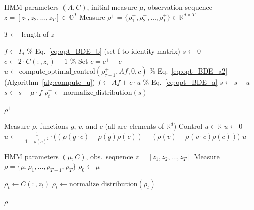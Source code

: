 \documentclass[twoside,11pt]{article}
\def\Re{\mathbb{R}}
\newcommand{\field}[1]{\mathbb{#1}}
\def\Re{\field{R}}
\def\Re{\mathbb{R}}
\renewcommand{\Re}{\mathbb{R}}
\def\clN{{\cal N}}
\def\bO{\mathbb{O}}
\def\dfltr{{\text{\rm (dfltr)}}}
\begin{document}
\begin{algorithm}
  \caption{Dual filter $\clN^\dfltr$ (single-shot)}
  \label{alg:dual_filter_single_shot}
  \begin{algorithmic}[1]
  \REQUIRE HMM parameters $(A,C)$, initial measure $\mu$, observation sequence $z
  =[z_1,z_2,\hdots,z_T]\in\bO^T$
  \ENSURE Measure $\rho^+ = \{\rho_1^+,\rho_2^+,\hdots,\rho_{T}^+\}\in \Re^{d\times T}$
  
  \STATE $T \gets$ length of $z$
  
    \STATE $f \gets I_d$ \hfill \% Eq.~\eqref{eq:opt_BDE_b} (set f to identity matrix)
    \STATE $s \gets 0$
      \STATE $c \gets 2 \cdot C(:,z_{\tau}) - 1$ \hfill \% Set $c= c^+-c^-$
      \STATE $u \gets \text{compute\_optimal\_control}(\rho^+_{\tau-1}, {A}f, 0, c)$ \hfill \% Eq.~\eqref{eq:opt_BDE_a2} (Algorithm~\ref{alg:compute_u})
      \STATE $f \gets A f + c \cdot u$ \hfill \% Eq.~\eqref{eq:opt_BDE_a}
      \STATE $s \gets s-u$
    \ENDFOR
    \STATE $s \gets  s+\mu \cdot f$
    \STATE $\rho^+_t \gets \text{normalize\_distribution}(s)$
  \ENDFOR
  
  \RETURN $\rho^+$
  
  \end{algorithmic}
\end{algorithm}




\begin{algorithm}
\caption{Computation of control input $u$}
\label{alg:compute_u}
\begin{algorithmic}[1]
\REQUIRE Measure $\rho$, functions $g$, $v$, and $c$ (all are elements
of $\Re^d$)
\ENSURE Control $u\in\Re$
    \STATE $u \gets 0$
\ELSE
    \STATE $u \gets -\frac{1}{1 - \rho(c)^2} \cdot \big( (\rho(g \cdot c) - \rho(g) \rho(c)) + (\rho(v) - \rho(v \cdot c) \rho(c)) \big)$
\ENDIF
\RETURN $u$

\end{algorithmic}
\end{algorithm}

\begin{algorithm}
  \caption{Initialization of $\rho$}
  \label{alg:initialize_rho}
  \begin{algorithmic}[1]
  \REQUIRE HMM parameters $(\mu,C)$, obs.~sequence $z
  =[z_1,z_2,\hdots,z_T]$
  \ENSURE Measure $\rho = \{\mu,\rho_1,\hdots,\rho_{T-1},\rho_T\}$
  \STATE $\rho_0 \gets \mu$
  
  \STATE $\rho_t \gets C(:,z_t)$
  \STATE $\rho_t \gets \text{normalize\_distribution}(\rho_t)$
  \ENDFOR
  
  \RETURN $\rho$
  
  \end{algorithmic}
  \end{algorithm}
\end{document}
